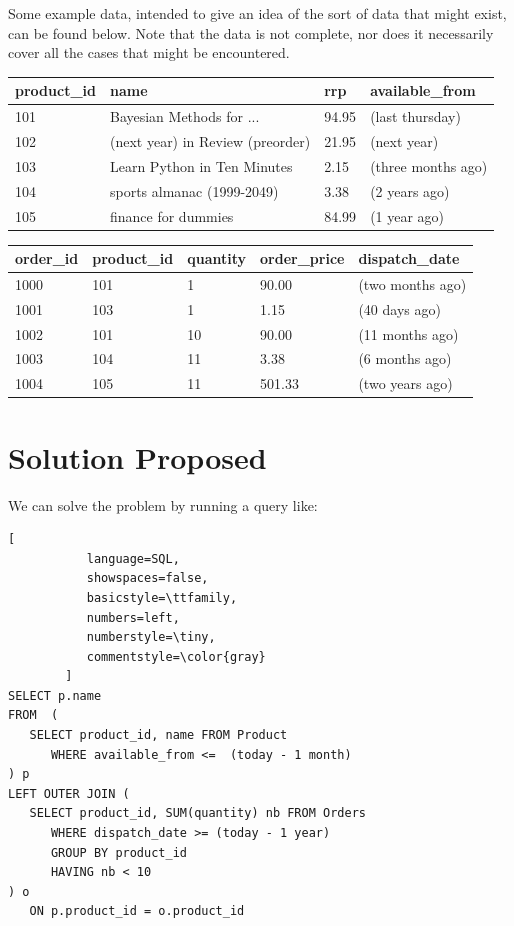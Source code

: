 \documentclass[12pt,a4paper,article]{memoir} %
\begin{document}
Some example data, intended to give an idea of the sort of data that might exist, 
can be found below. Note that the data is not complete, 
nor does it necessarily cover all the cases that might be encountered.

\begin{center}
    \begin{tabular}{| l | l | l | l |}
    \hline
	product\_id & name & rrp & available\_from \\
	\hline 
	101 & Bayesian Methods for ...& 94.95 & (last thursday) \\
	102 & (next year) in Review (preorder) & 21.95 & (next year) \\
	103 & Learn Python in Ten Minutes & 2.15 & (three months ago) \\
	104 & sports almanac (1999-2049) & 3.38 & (2 years ago) \\
	105 & finance for dummies & 84.99 & (1 year ago)  \\
	\hline
    \end{tabular}
\end{center}
\begin{center}
    \begin{tabular}{| l | l | l | l | l |}
    \hline
	order\_id & product\_id & quantity & order\_price & dispatch\_date \\
	\hline 
	1000 & 101 & 1 & 90.00 & (two months ago) \\
	1001 & 103 & 1 & 1.15 & (40 days ago) \\
	1002 & 101 & 10 & 90.00 & (11 months ago) \\
	1003 & 104 & 11 & 3.38 & (6 months ago) \\
	1004 & 105 & 11 & 501.33 & (two years ago) \\
	\hline
    \end{tabular}
\end{center}

\section{Solution Proposed}
We can solve the problem by running a query like:
\begin{lstlisting}[
           language=SQL,
           showspaces=false,
           basicstyle=\ttfamily,
           numbers=left,
           numberstyle=\tiny,
           commentstyle=\color{gray}
        ]
SELECT p.name
FROM  (
   SELECT product_id, name FROM Product 
      WHERE available_from <=  (today - 1 month)
) p
LEFT OUTER JOIN (
   SELECT product_id, SUM(quantity) nb FROM Orders
      WHERE dispatch_date >= (today - 1 year)
      GROUP BY product_id
      HAVING nb < 10
) o
   ON p.product_id = o.product_id
\end{lstlisting}
\end{document}
